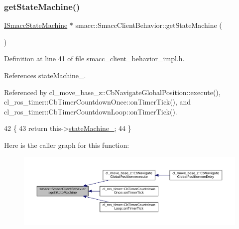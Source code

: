 \subsubsection{\texorpdfstring{get\+State\+Machine()}{getStateMachine()}}
{\footnotesize\ttfamily \hyperlink{classsmacc_1_1ISmaccStateMachine}{I\+Smacc\+State\+Machine} $\ast$ smacc\+::\+Smacc\+Client\+Behavior\+::get\+State\+Machine (\begin{DoxyParamCaption}{ }\end{DoxyParamCaption})\hspace{0.3cm}{\ttfamily [inline]}}



Definition at line 41 of file smacc\+\_\+client\+\_\+behavior\+\_\+impl.\+h.



References state\+Machine\+\_\+.



Referenced by cl\+\_\+move\+\_\+base\+\_\+z\+::\+Cb\+Navigate\+Global\+Position\+::execute(), cl\+\_\+ros\+\_\+timer\+::\+Cb\+Timer\+Countdown\+Once\+::on\+Timer\+Tick(), and cl\+\_\+ros\+\_\+timer\+::\+Cb\+Timer\+Countdown\+Loop\+::on\+Timer\+Tick().


\begin{DoxyCode}
42 \{
43     \textcolor{keywordflow}{return} this->\hyperlink{classsmacc_1_1SmaccClientBehavior_a7950b5684d6de0a8e8959c0936ce9a19}{stateMachine\_};
44 \}
\end{DoxyCode}
Here is the caller graph for this function\+:
\nopagebreak
\begin{figure}[H]
\begin{center}
\leavevmode
\includegraphics[width=350pt]{classsmacc_1_1SmaccClientBehavior_aa817da149f366f6a28794c04eb0744b0_icgraph}
\end{center}
\end{figure}
\mbox{\label{classsmacc_1_1SmaccClientBehavior_a7962382f93987c720ad432fef55b123f}} 
